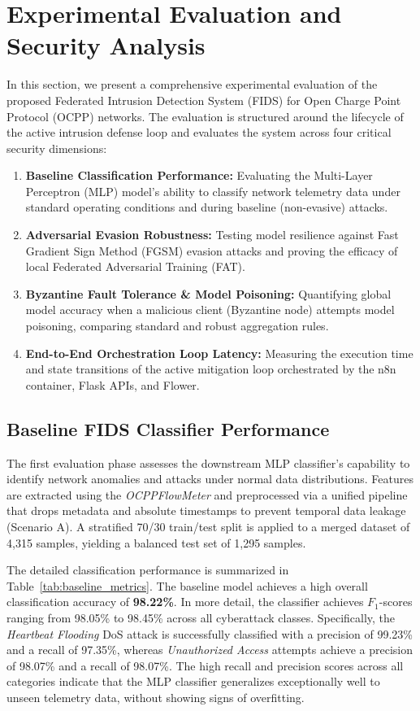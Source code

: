 \section{Experimental Evaluation and Security Analysis}
\label{sec:evaluation}

In this section, we present a comprehensive experimental evaluation of the proposed Federated Intrusion Detection System (FIDS) for Open Charge Point Protocol (OCPP) networks. The evaluation is structured around the lifecycle of the active intrusion defense loop and evaluates the system across four critical security dimensions:
\begin{enumerate}
    \item \textbf{Baseline Classification Performance:} Evaluating the Multi-Layer Perceptron (MLP) model's ability to classify network telemetry data under standard operating conditions and during baseline (non-evasive) attacks.
    \item \textbf{Adversarial Evasion Robustness:} Testing model resilience against Fast Gradient Sign Method (FGSM) evasion attacks and proving the efficacy of local Federated Adversarial Training (FAT).
    \item \textbf{Byzantine Fault Tolerance \& Model Poisoning:} Quantifying global model accuracy when a malicious client (Byzantine node) attempts model poisoning, comparing standard and robust aggregation rules.
    \item \textbf{End-to-End Orchestration Loop Latency:} Measuring the execution time and state transitions of the active mitigation loop orchestrated by the n8n container, Flask APIs, and Flower.
\end{enumerate}

\subsection{Baseline FIDS Classifier Performance}
\label{subsec:baseline_performance}
The first evaluation phase assesses the downstream MLP classifier's capability to identify network anomalies and attacks under normal data distributions. Features are extracted using the \textit{OCPPFlowMeter} and preprocessed via a unified pipeline that drops metadata and absolute timestamps to prevent temporal data leakage (Scenario A). A stratified 70/30 train/test split is applied to a merged dataset of 4,315 samples, yielding a balanced test set of 1,295 samples.

The detailed classification performance is summarized in Table~\ref{tab:baseline_metrics}. The baseline model achieves a high overall classification accuracy of \textbf{98.22\%}. In more detail, the classifier achieves $F_1$-scores ranging from 98.05\% to 98.45\% across all cyberattack classes. Specifically, the \textit{Heartbeat Flooding} DoS attack is successfully classified with a precision of 99.23\% and a recall of 97.35\%, whereas \textit{Unauthorized Access} attempts achieve a precision of 98.07\% and a recall of 98.07\%. The high recall and precision scores across all categories indicate that the MLP classifier generalizes exceptionally well to unseen telemetry data, without showing signs of overfitting.

